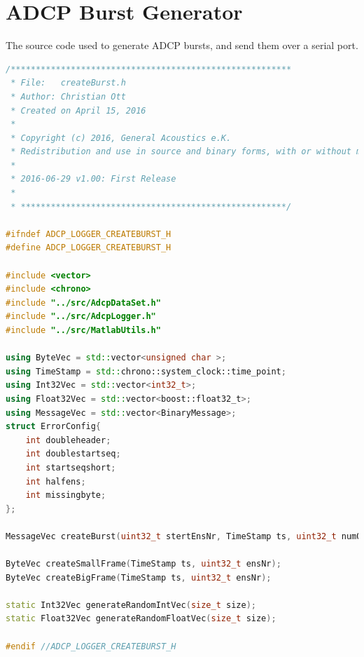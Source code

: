 \chapter{ADCP Burst Generator}
The source code used to generate ADCP bursts, and send them over a serial port.
\lstset{basicstyle=\tiny}
\begin{lstlisting}[language=C++]
/********************************************************
 * File:   createBurst.h
 * Author: Christian Ott
 * Created on April 15, 2016
 *
 * Copyright (c) 2016, General Acoustics e.K.
 * Redistribution and use in source and binary forms, with or without modification, are permitted!
 *
 * 2016-06-29 v1.00: First Release
 *
 * *****************************************************/

#ifndef ADCP_LOGGER_CREATEBURST_H
#define ADCP_LOGGER_CREATEBURST_H

#include <vector>
#include <chrono>
#include "../src/AdcpDataSet.h"
#include "../src/AdcpLogger.h"
#include "../src/MatlabUtils.h"

using ByteVec = std::vector<unsigned char >;
using TimeStamp = std::chrono::system_clock::time_point;
using Int32Vec = std::vector<int32_t>;
using Float32Vec = std::vector<boost::float32_t>;
using MessageVec = std::vector<BinaryMessage>;
struct ErrorConfig{
    int doubleheader;
    int doublestartseq;
    int startseqshort;
    int halfens;
    int missingbyte;
};

MessageVec createBurst(uint32_t stertEnsNr, TimeStamp ts, uint32_t numOfEns, ErrorConfig err );

ByteVec createSmallFrame(TimeStamp ts, uint32_t ensNr);
ByteVec createBigFrame(TimeStamp ts, uint32_t ensNr);

static Int32Vec generateRandomIntVec(size_t size);
static Float32Vec generateRandomFloatVec(size_t size);

#endif //ADCP_LOGGER_CREATEBURST_H

\end{lstlisting}
\pagebreak

